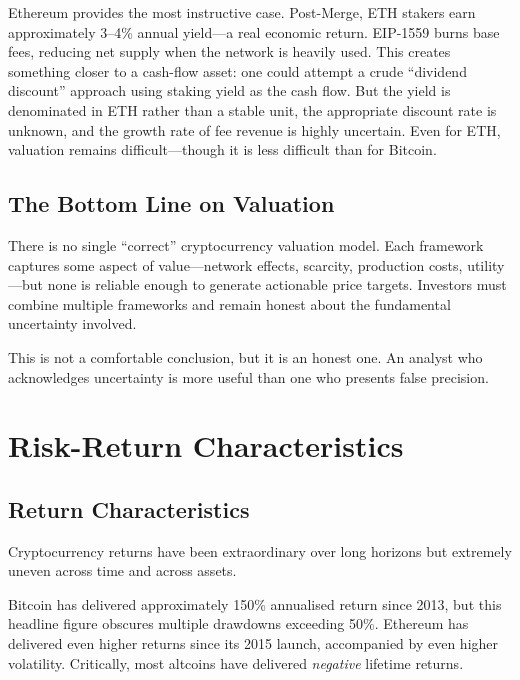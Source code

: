 \documentclass[11pt,a4paper]{article}
\begin{document}
Ethereum provides the most instructive case. Post-Merge, ETH stakers earn approximately 3--4\% annual yield---a real economic return. EIP-1559 burns base fees, reducing net supply when the network is heavily used. This creates something closer to a cash-flow asset: one could attempt a crude ``dividend discount'' approach using staking yield as the cash flow. But the yield is denominated in ETH rather than a stable unit, the appropriate discount rate is unknown, and the growth rate of fee revenue is highly uncertain. Even for ETH, valuation remains difficult---though it is less difficult than for Bitcoin.

\subsection{The Bottom Line on Valuation}

There is no single ``correct'' cryptocurrency valuation model. Each framework captures some aspect of value---network effects, scarcity, production costs, utility---but none is reliable enough to generate actionable price targets. Investors must combine multiple frameworks and remain honest about the fundamental uncertainty involved.

This is not a comfortable conclusion, but it is an honest one. An analyst who acknowledges uncertainty is more useful than one who presents false precision.

\section{Risk-Return Characteristics}

\subsection{Return Characteristics}

Cryptocurrency returns have been extraordinary over long horizons but extremely uneven across time and across assets.

Bitcoin has delivered approximately 150\% annualised return since 2013, but this headline figure obscures multiple drawdowns exceeding 50\%. Ethereum has delivered even higher returns since its 2015 launch, accompanied by even higher volatility. Critically, most altcoins have delivered \textit{negative} lifetime returns.
\end{document}
